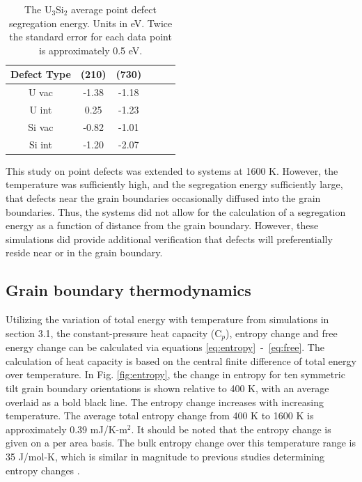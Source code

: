 \documentclass[review]{elsarticle}
\begin{document}
\begin{table}[h]
\caption{The U$_{3}$Si$_{2}$ average point defect segregation energy. Units in eV. Twice the standard error for each data point is approximately 0.5 eV.} \label{tab:seg}
\begin{center}
\begin{tabular}{|c|c|c|c|c|c|}
	\hline
	Defect Type & (210) & (730)\\
	 \hline
	 U vac & -1.38 & -1.18	 \\
	 U int & 0.25 & -1.23 \\
	 Si vac & -0.82 & -1.01	 \\
	 Si int & -1.20 & -2.07 \\
	 \hline
\end{tabular}
\end{center}
\label{default}
\end{table}

This study on point defects was extended to systems at 1600 K. However, the temperature was sufficiently high, and the segregation energy sufficiently large, that defects near the grain boundaries occasionally diffused into the grain boundaries. Thus, the systems did not allow for the calculation of a segregation energy as a function of distance from the grain boundary. However, these simulations did provide additional verification that defects will preferentially reside near or in the grain boundary. 

\FloatBarrier

\subsection{Grain boundary thermodynamics}

Utilizing the variation of total energy with temperature from simulations in section 3.1, the constant-pressure heat capacity (C$_{p}$), entropy change and free energy change can be calculated via equations \ref{eq:entropy}~-~\ref{eq:free}. The calculation of heat capacity is based on the central finite difference of total energy over temperature. In Fig. \ref{fig:entropy}, the change in entropy for ten symmetric tilt grain boundary orientations is shown relative to 400 K, with an average overlaid as a bold black line. The entropy change increases with increasing temperature. The average total entropy change from 400 K to 1600 K is approximately 0.39 mJ/K-m$^{2}$. It should be noted that the entropy change is given on a per area basis. The bulk entropy change over this temperature range is 35 J/mol-K, which is similar in magnitude to previous studies determining entropy changes \cite{mcnutt2014, peter2004}. 
\end{document}
